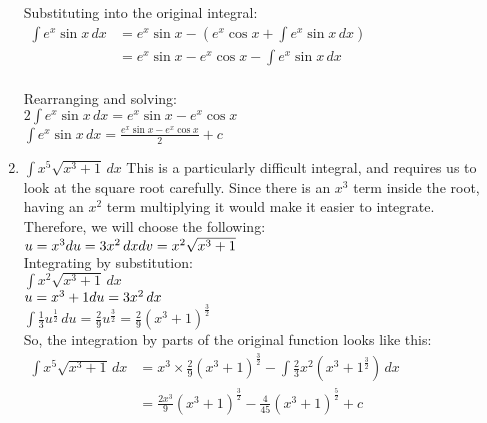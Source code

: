 \documentclass[../main.tex]{subfiles}
\begin{document}
\begin{enumerate}
    Substituting into the original integral:\\
    $
    \!
    \begin{aligned}
        \int e^x \sin{x}\, dx
        &=e^x\sin{x}-(e^x\cos{x}+\int e^x\sin{x}\, dx)\\
        &=e^x\sin{x}-e^x\cos{x}-\int e^x\sin{x}\, dx\\
    \end{aligned}
    $

    Rearranging and solving:\\
    \(2\int e^x \sin{x}\, dx=e^x\sin{x}-e^x\cos{x}\)\\
    \(\int e^x \sin{x}\, dx=\frac{e^x\sin{x}-e^x\cos{x}}{2}+c\)\\
    
    \item \(\int x^5 \sqrt{x^3+1}\, dx\) 
    This is a particularly difficult integral, and requires us to look at the square root carefully. Since there is an \(x^3\) term inside the root, having an \(x^2\) term multiplying it would make it easier to integrate.\\
    
    Therefore, we will choose the following:\\
    \(u=x^3\\
    du=3x^2\,dx\\
    dv=x^2\sqrt{x^3+1}\)\\
    Integrating by substitution:\\
    \(\int x^2 \sqrt{x^3+1}\, dx\) \\
    \(u=x^3+1\\
    du=3x^2\,dx\)\\
    \(\int \frac{1}{3}u^{\frac{1}{2}}\,du=\frac{2}{9}u^{\frac{3}{2}}=\frac{2}{9}(x^3+1)^{\frac{3}{2}}\)\\

    So, the integration by parts of the original function looks like this:\\
    $
    \!
    \begin{aligned}
        \int x^5 \sqrt{x^3+1}\, dx
        &=x^3\times \frac{2}{9}(x^3+1)^{\frac{3}{2}}-\int \frac{2}{3}x^2(x^3+1^{\frac{3}{2}})\,dx\\
        &=\frac{2x^3}{9}(x^3+1)^{\frac{3}{2}}-\frac{4}{45}(x^3+1)^{\frac{5}{2}}+c
    \end{aligned}$

    
\end{enumerate}
\end{document}
